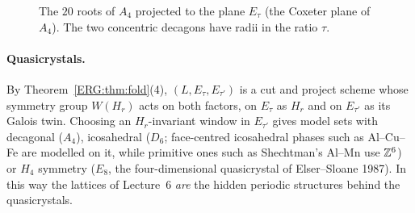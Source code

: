 \begin{figure}[ht]
\centering
{}
\caption{The $20$ roots of $A_4$ projected to the plane $E_\tau$ (the Coxeter plane of $A_4$). The two
concentric decagons have radii in the ratio $\tau$.}
\label{ERG:fig:a4}
\end{figure}

\paragraph{Quasicrystals.} By Theorem~\ref{ERG:thm:fold}(4), $(L,E_\tau,E_{\tau'})$ is a cut and project
scheme whose symmetry group $W(H_r)$ acts on both factors, on $E_\tau$ as $H_r$ and on $E_{\tau'}$ as its
Galois twin. Choosing an $H_r$-invariant window in $E_{\tau'}$ gives model sets with decagonal ($A_4$),
icosahedral ($D_6$; face-centred icosahedral phases such as Al--Cu--Fe are modelled on it, while
primitive ones such as Shechtman's Al--Mn use $\mathbb{Z}^6$) or $H_4$ symmetry ($E_8$, the
four-dimensional quasicrystal of Elser--Sloane 1987). In this way the lattices of Lecture~6 \emph{are}
the hidden periodic structures behind the quasicrystals.

